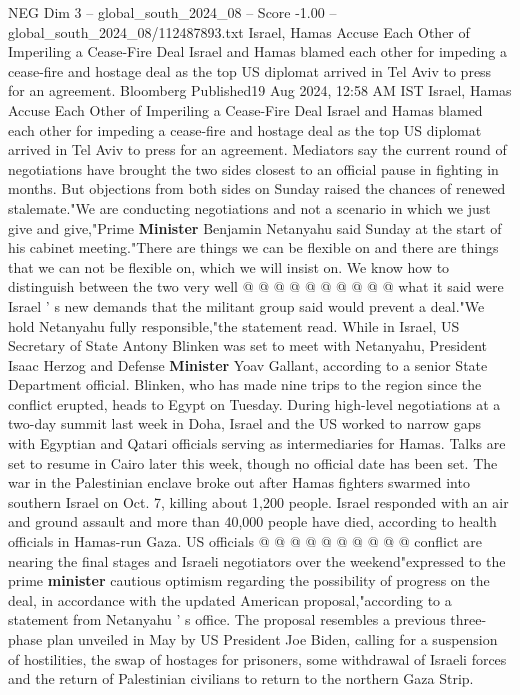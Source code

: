\begin{textsample}{NEG Dim 3 – global\_south\_2024\_08 – Score -1.00 – global\_south\_2024\_08/112487893.txt}  \label{ex:f3_neg_153}
Israel, Hamas Accuse Each Other of Imperiling a Cease-Fire Deal Israel and Hamas blamed each other for impeding a cease-fire and hostage deal as the top US diplomat arrived in Tel Aviv to press for an agreement.
Bloomberg Published19 Aug 2024, 12:58 AM IST Israel, Hamas Accuse Each Other of Imperiling a Cease-Fire Deal Israel and Hamas blamed each other for impeding a cease-fire and hostage deal as the top US diplomat arrived in Tel Aviv to press for an agreement.
Mediators say the current round of negotiations have brought the two sides closest to an official pause in fighting in months.
But objections from both sides on Sunday raised the chances of renewed stalemate."We are conducting negotiations and not a scenario in which we just give and give,"Prime \textbf{Minister} Benjamin Netanyahu said Sunday at the start of his cabinet meeting."There are things we can be flexible on and there are things that we can not be flexible on, which we will insist on.
We know how to distinguish between the two very well @ @ @ @ @ @ @ @ @ @ what it said were Israel ' s new demands that the militant group said would prevent a deal."We hold Netanyahu fully responsible,"the statement read.
While in Israel, US Secretary of State Antony Blinken was set to meet with Netanyahu, President Isaac Herzog and Defense \textbf{Minister} Yoav Gallant, according to a senior State Department official.
Blinken, who has made nine trips to the region since the conflict erupted, heads to Egypt on Tuesday.
During high-level negotiations at a two-day summit last week in Doha, Israel and the US worked to narrow gaps with Egyptian and Qatari officials serving as intermediaries for Hamas.
Talks are set to resume in Cairo later this week, though no official date has been set.
The war in the Palestinian enclave broke out after Hamas fighters swarmed into southern Israel on Oct. 7, killing about 1,200 people.
Israel responded with an air and ground assault and more than 40,000 people have died, according to health officials in Hamas-run Gaza.
US officials @ @ @ @ @ @ @ @ @ @ conflict are nearing the final stages and Israeli negotiators over the weekend"expressed to the prime \textbf{minister} cautious optimism regarding the possibility of progress on the deal, in accordance with the updated American proposal,"according to a statement from Netanyahu ' s office.
The proposal resembles a previous three-phase plan unveiled in May by US President Joe Biden, calling for a suspension of hostilities, the swap of hostages for prisoners, some withdrawal of Israeli forces and the return of Palestinian civilians to return to the northern Gaza Strip.

\end{textsample}
